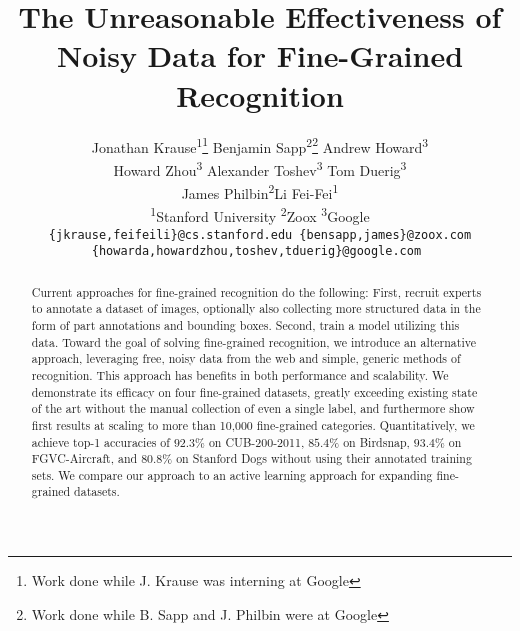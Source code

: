 \documentclass[runningheads]{llncs}
\begin{document}
\pagestyle{headings}
\mainmatter


\def\etal{\emph{et al.}}
\def\ie{\emph{i.e.~}}
\def\eg{\emph{e.g.~}}
\newcommand{\no}[1]{}
\newcommand{\lbird}{L-Bird}
\newcommand{\lair}{L-Aircraft}
\newcommand{\llep}{L-Butterfly}
\newcommand{\ldog}{L-Dog}
\newcommand{\fgvc}{FGVC}
\newcommand{\fgvcgt}{FGVC-GT}
\newcommand{\cubgt}{CUB-GT}
\newcommand{\birdsnapgt}{Birdsnap-GT}
\newcommand{\doggt}{Dogs-GT}
\newcommand{\argmin}{\mathop{\arg\min}}
\newcommand{\argmax}{\mathop{\arg\max}}

\newcommand{\repeatthanks}{\textsuperscript{\thefootnote}}

\title{The Unreasonable Effectiveness of Noisy Data for Fine-Grained Recognition}


\authorrunning{Krause \etal}

\author{
  Jonathan Krause\textsuperscript{1}\thanks{Work done while J. Krause was interning at Google} \quad Benjamin Sapp\textsuperscript{2}\thanks{Work done while B. Sapp and J. Philbin were at Google} \quad Andrew Howard\textsuperscript{3} \\
  Howard Zhou\textsuperscript{3} \quad Alexander Toshev\textsuperscript{3} \quad Tom Duerig\textsuperscript{3} \\
  James Philbin\textsuperscript{2}\repeatthanks  \quad Li Fei-Fei\textsuperscript{1} \\
  \textsuperscript{1}Stanford University \qquad \textsuperscript{2}Zoox \qquad \textsuperscript{3}Google\\
  {\tt\small \{jkrause,feifeili\}@cs.stanford.edu \quad \{bensapp,james\}@zoox.com} \\
  {\tt\small \{howarda,howardzhou,toshev,tduerig\}@google.com }
}

\institute{} 

\maketitle

\begin{abstract}
Current approaches for fine-grained recognition do the following: First, recruit experts to annotate a dataset of images, optionally also collecting more structured data in the form of part annotations and bounding boxes.
Second, train a model utilizing this data.
Toward the goal of solving fine-grained recognition, we introduce an alternative approach, leveraging free, noisy data from the web and simple, generic methods of recognition.
This approach has benefits in both performance and scalability.
We demonstrate its efficacy on four fine-grained datasets, greatly exceeding existing state of the art without the manual collection of even a single label, and furthermore show first results at scaling to more than 10,000 fine-grained categories.
Quantitatively, we achieve top-1 accuracies of $92.3\%$ on CUB-200-2011, $85.4\%$ on Birdsnap, $93.4\%$ on FGVC-Aircraft, and $80.8\%$ on Stanford Dogs without using their annotated training sets.
We compare our approach to an active learning approach for expanding fine-grained datasets.
\end{abstract}
\end{document}

